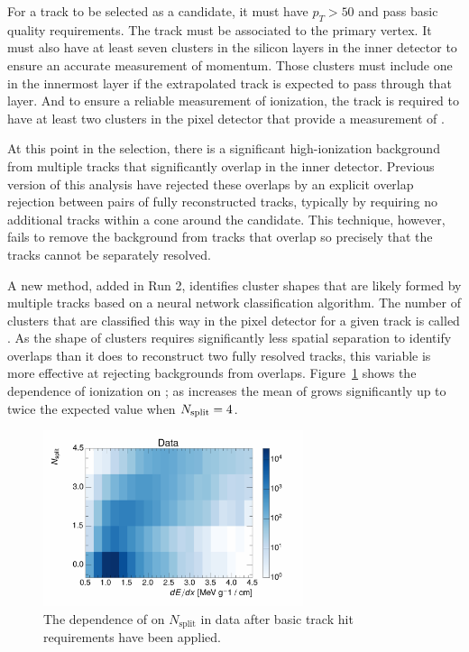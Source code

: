 For a track to be selected as a candidate, it must have $p_T > 50$ \GeV and pass basic quality requirements. 
The track must be associated to the primary vertex.
It must also have at least seven clusters in the silicon layers in the inner detector to ensure an accurate measurement of momentum.
Those clusters must include one in the innermost layer if the extrapolated track is expected to pass through that layer.
And to ensure a reliable measurement of ionization, the track is required to have at least two clusters in the pixel detector that provide a measurement of \dedx.

At this point in the selection, there is a significant high-ionization background from multiple tracks that significantly overlap in the inner detector. 
Previous version of this analysis have rejected these overlaps by an explicit overlap rejection between pairs of fully reconstructed tracks, typically by requiring no additional tracks within a cone around the candidate. 
This technique, however, fails to remove the background from tracks that overlap so precisely that the tracks cannot be separately resolved.

A new method, added in Run 2, identifies cluster shapes that are likely formed by multiple tracks based on a neural network classification algorithm. 
The number of clusters that are classified this way in the pixel detector for a given track is called \Nsplit.
As the shape of clusters requires significantly less spatial separation to identify overlaps than it does to reconstruct two fully resolved tracks, this variable is more effective at rejecting backgrounds from overlaps.
Figure~\ref{fig:dedx_nsplit} shows the dependence of ionization on \Nsplit; as \Nsplit increases the mean of \dedx grows significantly up to twice the expected value when $N_{\mathrm{split}} = 4$. 

\begin{figure}[h]
\centering
\includegraphics[width=0.68\textwidth]{figures/dedx_nsplit_data.pdf}
\caption{The dependence of \dedx on $N_{\mathrm{split}}$ in data after basic track hit requirements have been applied.}
\label{fig:dedx_nsplit}
\end{figure}

